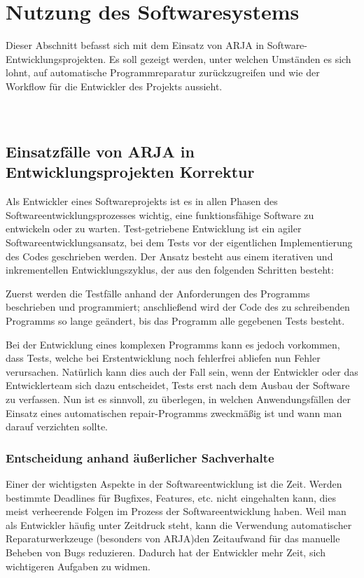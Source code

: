 \documentclass[11pt,a4paper]{article}
\begin{document}
\section{Nutzung des Softwaresystems}
Dieser Abschnitt befasst sich mit dem Einsatz von ARJA in Software-Entwicklungsprojekten. Es soll gezeigt werden, unter welchen Umständen
es sich lohnt, auf automatische Programmreparatur zurückzugreifen und wie der Workflow für die Entwickler des Projekts aussieht.
\\ \\ \\ \subsection{Einsatzfälle von ARJA in Entwicklungsprojekten Korrektur}
Als Entwickler eines Softwareprojekts ist es in allen Phasen des Softwareentwicklungsprozesses wichtig, eine funktionsfähige Software zu entwickeln oder zu warten.
Test-getriebene Entwicklung ist ein agiler Softwareentwicklungsansatz, bei dem Tests vor der eigentlichen Implementierung des Codes geschrieben werden. Der Ansatz besteht aus einem iterativen und inkrementellen Entwicklungszyklus, der aus den folgenden Schritten besteht:

Zuerst werden die Testfälle anhand der Anforderungen des Programms beschrieben und programmiert; anschließend wird der Code des zu schreibenden Programms so lange geändert, bis das Programm alle gegebenen Tests besteht.

Bei der Entwicklung eines komplexen Programms kann es jedoch vorkommen, dass Tests, welche bei Erstentwicklung noch fehlerfrei abliefen nun Fehler verursachen. Natürlich kann dies auch der Fall sein, wenn der Entwickler oder das Entwicklerteam sich dazu entscheidet, Tests erst nach dem Ausbau der Software zu verfassen. Nun ist es sinnvoll, zu überlegen, in welchen Anwendungsfällen der Einsatz eines automatischen repair-Programms zweckmäßig ist und wann man darauf verzichten sollte.

\subsubsection{Entscheidung anhand äußerlicher Sachverhalte}

Einer der wichtigsten Aspekte in der Softwareentwicklung ist die Zeit. Werden bestimmte Deadlines für Bugfixes, Features, etc. nicht eingehalten kann, dies meist verheerende Folgen im Prozess der Softwareentwicklung haben. Weil man als Entwickler häufig unter Zeitdruck steht, kann die Verwendung automatischer Reparaturwerkzeuge (besonders von ARJA)den Zeitaufwand für das manuelle Beheben von Bugs reduzieren. Dadurch hat der Entwickler mehr Zeit, sich wichtigeren Aufgaben zu widmen.
\end{document}
